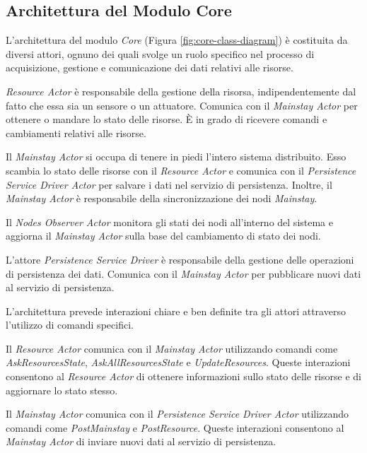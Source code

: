 \documentclass[12pt]{article}
\begin{document}
\subsection{Architettura del Modulo Core}

L'architettura del modulo \textit{Core} (Figura \ref{fig:core-class-diagram}) è costituita da diversi attori, ognuno dei quali svolge un ruolo specifico nel processo di acquisizione, gestione e comunicazione dei dati relativi alle risorse.

\textit{Resource Actor} è responsabile della gestione della risorsa, indipendentemente dal fatto che essa sia un sensore o un attuatore. Comunica con il \textit{Mainstay Actor} per ottenere o mandare lo stato delle risorse. È in grado di ricevere comandi e cambiamenti relativi alle risorse.

Il \textit{Mainstay Actor} si occupa di tenere in piedi l'intero sistema distribuito. Esso scambia lo stato delle risorse con il \textit{Resource Actor} e comunica con il \textit{Persistence Service Driver Actor} per salvare i dati nel servizio di persistenza. Inoltre, il \textit{Mainstay Actor} è responsabile della sincronizzazione dei nodi \textit{Mainstay}.

Il \textit{Nodes Observer Actor} monitora gli stati dei nodi all'interno del sistema e aggiorna il \textit{Mainstay Actor} sulla base del cambiamento di stato dei nodi.

L'attore \textit{Persistence Service Driver} è responsabile della gestione delle operazioni di persistenza dei dati. Comunica con il \textit{Mainstay Actor} per pubblicare nuovi dati al servizio di persistenza.

L'architettura prevede interazioni chiare e ben definite tra gli attori attraverso l'utilizzo di comandi specifici.

Il \textit{Resource Actor} comunica con il \textit{Mainstay Actor} utilizzando comandi come \textit{AskResourcesState}, \textit{AskAllResourcesState} e \textit{UpdateResources}. Queste interazioni consentono al \textit{Resource Actor} di ottenere informazioni sullo stato delle risorse e di aggiornare lo stato stesso.

Il \textit{Mainstay Actor} comunica con il \textit{Persistence Service Driver Actor} utilizzando comandi come \textit{PostMainstay} e \textit{PostResource}. Queste interazioni consentono al \textit{Mainstay Actor} di inviare nuovi dati al servizio di persistenza.
\end{document}
